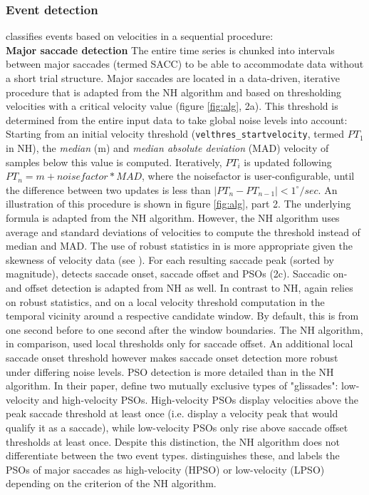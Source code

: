 \subsubsection*{Event detection}
\remodnav classifies events based on velocities in a sequential procedure: \\
 \textbf{Major saccade detection} The entire time series is chunked into intervals between major saccades (termed SACC) to be able to accommodate data without a short trial structure. Major saccades are located in a data-driven, iterative procedure that is adapted from the NH algorithm and based on thresholding velocities with a critical velocity value (figure \ref{fig:alg}, 2a). This threshold is determined from the entire input data to take global noise levels into account: Starting from an initial velocity threshold (\texttt{velthres\_startvelocity}, termed $PT_1$ in NH), the \textit{median} (m) and \textit{median absolute deviation} (MAD) velocity of samples below this value is computed. Iteratively, $PT_i$ is updated following $PT_n = m + noisefactor * MAD$, where the noisefactor is user-configurable, until the difference between two updates is less than $|PT_n - PT_{n-1}| < 1^\circ/sec$. An illustration of this procedure is shown in figure \ref{fig:alg}, part 2. The underlying formula is adapted from the NH algorithm. However, the NH algorithm uses average and standard deviations of velocities to compute the threshold instead of median and MAD. The use of robust statistics in \remodnav is more appropriate given the skewness of velocity data (see \cite{Friedman2018}). For each resulting saccade peak (sorted by magnitude), \remodnav detects saccade onset, saccade offset and PSOs (2c). Saccadic on- and offset detection is adapted from NH as well. In contrast to NH, \remodnav again relies on robust statistics, and on a local velocity threshold computation in the temporal vicinity around a respective candidate window. By default, this is from one second before to one second after the window boundaries. The NH algorithm, in comparison, used local thresholds only for saccade offset. An additional local saccade onset threshold however makes saccade onset detection more robust under differing noise levels.  PSO detection is more detailed than in the NH algorithm. In their paper, \cite{Nystrom2010AnData} define two mutually exclusive types of "glissades": low-velocity and high-velocity PSOs. High-velocity PSOs display velocities above the peak saccade threshold at least once (i.e. display a velocity peak that would qualify it as a saccade), while low-velocity PSOs only rise above saccade offset thresholds at least once. Despite this distinction, the NH algorithm does not differentiate between the two event types. \remodnav distinguishes these, and labels the PSOs of major saccades as high-velocity (HPSO) or low-velocity (LPSO) depending on the criterion of the NH algorithm.
 
